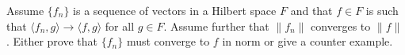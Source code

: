 Assume $\{f_n\}$ is a sequence of vectors in a Hilbert space $F$ and
that $f\in F$ is such that $\langle f_n,g \rangle\rightarrow \langle
f,g \rangle$ for all $g\in F$. Assume further that $\|f_n\|$ converges
to $\|f\|$. Either prove that $\{f_n\}$ must converge to $f$ in norm
or give a counter example.

